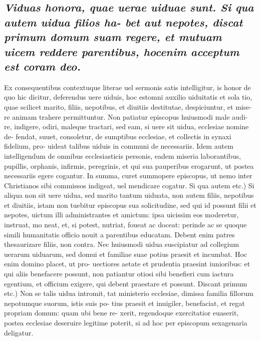 \documentclass{article}
\begin{document}
\begin{pages}
\subsection*{\textit{Viduas honora, quae uerae uiduae sunt. Si qua autem uidua filios ha- bet aut nepotes, discat primum domum suam regere, et mutuam uicem reddere parentibus, hocenim acceptum est coram deo. }}\pstart Ex consequentibus contextuque literae uel sermonis satis intelligitur, is honor de quo hic dicitur, deferendus uere uiduis, hoc estomni auxilio uiduitatis et sola tio, quae scilicet marito, filiis, nepotibus, et diuitiis destitutae, despiciuntur, et mise- re animam trahere permittuntur. Non patiatur episcopus huiusmodi male audi- re, indigere, odiri, maleque tractari, sed eam, si uere sit uidua, ecclesiae nomine de- fendat, suuet, consoletur, de sumptibus ecclesiae, et collectis in synaxi fidelium, pro- uideat talibus uiduis in communi de necessariis. Idem autem intelligendum de omnibus ecclesiasticis personis, eadem miseria laborantibus, pupillis, orphanis, infirmis, peregrinis, et qui sua pauperibus erogarunt, ut postea necessariis egere cogantur. In summa, curet summopere episcopus, ut nemo inter Christianos sibi commissos indigeat, uel mendicare cogatur. Si qua autem etc.) Si aliqua non sit uere uidua, sed marito tantum uiduata, non autem filiis, nepotibus et diuitiis, istam non tuebitur episcopus sua solicitudine, sed qui id possunt filii et nepotes, uictum illi administrantes et amictum: ipsa uicissim eos moderetur, instruat, mo neat, et, si potest, nutriat, foueat ac doceat: perinde ac se quoque simili humanitatis officio nouit a parentibus educatam. Debent enim patres thesaurizare filiis, non contra. Nec huiusmodi uidua suscipiatur ad collegium uerarum uiduarum, sed domui et familiae suae potius praesit et incumbat. Hoc enim domino placet, ut pro- uectiores aetate et prudentia praesint iunioribus: et qui aliis benefacere possunt, non patiantur otiosi sibi benefieri cum iactura egentium, et officium exigere, qui debent praestare et possunt. Discant primum etc.) Non se talis uidua intromit, tat ministerio ecclesiae, dimissa familia fillorum nepotumque suorum, istis suis po- tius praesit et inuigiler, benefaciat, et regat propriam domum: quam ubi bene re- xerit, regendoque exercitatior euaserit, postea ecclesiae deseruire legitime poterit, si ad hoc per episcopum sexagenaria deligatur.  \pend
{}
{}

\end{pages}
\end{document}
